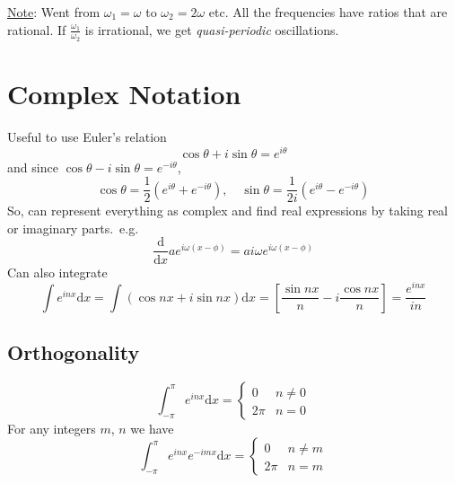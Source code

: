 \documentclass[12pt]{report}
\theoremstyle{definition}
\begin{document}
\underline{Note}: Went from $\omega_1 = \omega$ to $\omega_2 = 2\omega$ etc. All the frequencies have ratios that are rational.
If $\frac{\omega_1}{\omega_2}$ is irrational, we get \emph{quasi-periodic} oscillations.

\section{Complex Notation}
Useful to use Euler's relation\[
    \cos{\theta} + i\sin{\theta} = e^{i\theta}
\] and since $\cos{\theta} - i\sin{\theta} = e^{-i\theta}$, \[
\cos{\theta} = \frac{1}{2} \left(e^{i\theta} + e^{-i\theta}\right), \quad 
\sin{\theta} = \frac{1}{2i} \left(e^{i\theta} - e^{-i\theta}\right) 
\]
So, can represent everything as complex and find real expressions by taking real or imaginary parts.\ e.g.\[
    \frac{\mathrm{d}}{\mathrm{d}x} ae^{i\omega(x - \phi)} = ai\omega e^{i\omega(x - \phi)}
\]
Can also integrate \[
    \int e^{inx}\mathrm{d}x = \int (\cos{nx} + i\sin{nx})\mathrm{d}x 
    = \left[\frac{\sin{nx}}{n} - i \frac{\cos{nx}}{n}\right] = \frac{e^{inx}}{in}
\]

\subsection*{Orthogonality}
\[
    \int_{-\pi}^{\pi} e^{inx}\mathrm{d}x = 
    \begin{cases}
        0 & n \neq 0 \\
        2\pi & n = 0
    \end{cases}
\]
For any integers $m$, $n$ we have\[
    \int_{-\pi}^{\pi} e^{inx}e^{-imx}\mathrm{d}x =
    \begin{cases}
        0 & n \neq m \\
        2\pi & n = m
    \end{cases}
\]
\end{document}
